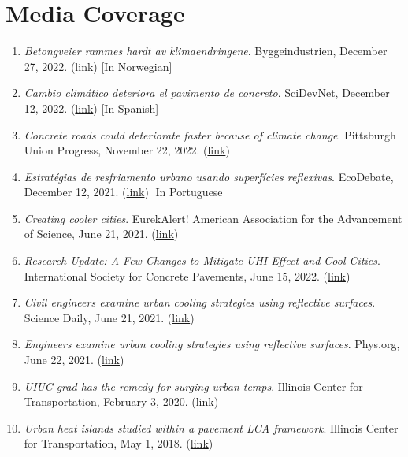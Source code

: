 \documentclass[12pt]{article}
\begin{document}
\section*{Media Coverage}
\hfill
\begin{enumerate}
	\item \textit{Betongveier rammes hardt av klimaendringene}. Byggeindustrien, December 27, 2022. (\href{https://www.bygg.no/betongveier-rammes-hardt-av-klimaendringene/1514889!/}{link}) [In Norwegian]
	\item \textit{Cambio climático deteriora el pavimento de concreto}. SciDevNet, December 12, 2022. (\href{https://www.scidev.net/america-latina/news/cambio-climatico-deteriora-el-pavimento-de-concreto//}{link}) [In Spanish]
	\item \textit{Concrete roads could deteriorate faster because of climate change}. Pittsburgh Union Progress, November 22, 2022. (\href{https://www.unionprogress.com/2022/11/22/concrete-roads-could-deteriorate-faster-because-of-climate-change/}{link})
	\item \textit{Estratégias de resfriamento urbano usando superfícies reflexivas}. EcoDebate, December 12, 2021. (\href{https://www.ecodebate.com.br/2021/06/21/estrategias-de-resfriamento-urbano-usando-superficies-reflexivas/}{link}) [In Portuguese]
	\item \textit{Creating cooler cities}. EurekAlert! American Association for the Advancement of Science, June 21, 2021. (\href{https://www.eurekalert.org/news-releases/536867}{link})
	\item \textit{Research Update: A Few Changes to Mitigate UHI Effect and Cool Cities}. International Society for Concrete Pavements, June 15, 2022. (\href{https://www.concretepavements.org/2021/06/15/18878/}{link})
	\item \textit{Civil engineers examine urban cooling strategies using reflective surfaces}. Science Daily, June 21, 2021. (\href{https://www.sciencedaily.com/releases/2021/06/210621174101.htm}{link})
	\item \textit{Engineers examine urban cooling strategies using reflective surfaces}. Phys.org, June 22, 2021. (\href{https://phys.org/news/2021-06-urban-cooling-strategies-surfaces.html/}{link})
	\item \textit{UIUC grad has the remedy for surging urban temps}. Illinois Center for Transportation, February 3, 2020. (\href{https://ict.illinois.edu/news/newsletters/more-newsletters/february-2020/uiuc-grad-has-the-treatment-for-surging-urban-temps}{link})
	\item \textit{Urban heat islands studied within a pavement LCA framework}. Illinois Center for Transportation, May 1, 2018. (\href{https://ict.illinois.edu/news/newsletters/more-newsletters/may-2018/urban-heat-islands-studied-within-a-pavement-lca-framework}{link})

\end{enumerate}
\end{document}
